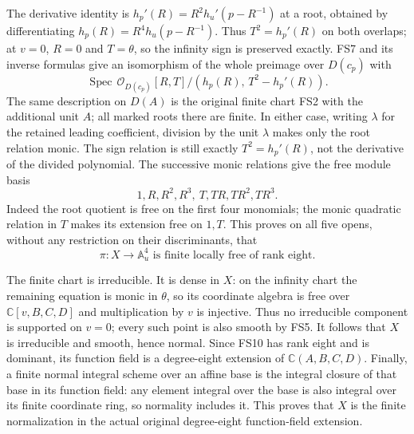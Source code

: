 \documentclass[11pt]{article}
\newcommand{\C}{\mathbb C}
\providecommand{\Spec}{\operatorname{Spec}}
\begin{document}
The derivative identity is
$h_p'(R)=R^2h_u'(p-R^{-1})$ at a root, obtained by
differentiating $h_p(R)=R^4h_u(p-R^{-1})$.
Thus $T^2=h_p'(R)$ on both overlaps; at $v=0$, $R=0$
and $T=\theta$, so the infinity sign is preserved exactly.
FS7 and its inverse formulas give an isomorphism of the
whole preimage over $D(c_p)$ with
\begin{equation}
\Spec\,\mathcal O_{D(c_p)}[R,T]/
                 (h_p(R),\,T^2-h_p'(R)).
\tag{FS8}
\end{equation}
The same description on $D(A)$ is the original finite
chart FS2 with the additional unit $A$; all marked roots
there are finite. In either case, writing $\lambda$ for
the retained leading coefficient, division by the unit
$\lambda$ makes only the root relation monic.
The sign relation is still exactly $T^2=h_p'(R)$,
not the derivative of the divided polynomial.
The successive monic relations give the free module basis
\begin{equation}
1,R,R^2,R^3,\ T,TR,TR^2,TR^3 .
\tag{FS9}
\end{equation}
Indeed the root quotient is free on the first four monomials;
the monic quadratic relation in $T$ makes its extension
free on $1,T$. This proves on all five opens, without
any restriction on their discriminants, that
\begin{equation}
\pi:X\longrightarrow\mathbb A^4_u
\text{ is finite locally free of rank eight.}
\tag{FS10}
\end{equation}

The finite chart is irreducible. It is dense in $X$:
on the infinity chart the remaining equation is monic
in $\theta$, so its coordinate algebra is free over
$\C[v,B,C,D]$ and multiplication by $v$ is injective.
Thus no irreducible component is supported on $v=0$;
every such point is also smooth by FS5.
It follows that $X$ is irreducible and smooth, hence normal.
Since FS10 has rank eight and is dominant, its function
field is a degree-eight extension of $\C(A,B,C,D)$.
Finally, a finite normal integral scheme over an affine
base is the integral closure of that base in its function
field: any element integral over the base is also integral
over its finite coordinate ring, so normality includes it.
This proves that $X$ is the finite normalization in the
actual original degree-eight function-field extension.
\end{document}
